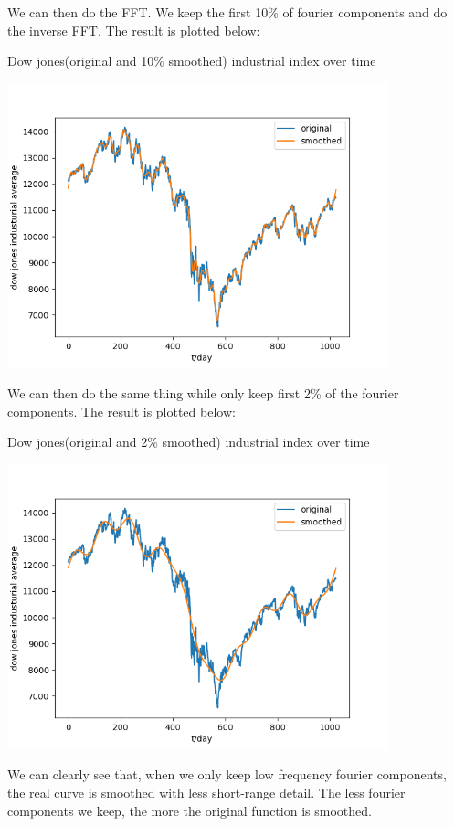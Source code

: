 \documentclass[letterpaper,12pt]{article}
\begin{document}
We can then do the FFT. We keep the first 10\% of fourier components and do the inverse FFT. The result is plotted below:

\begin{table}[!h]
    \centering
    \caption{Dow jones(original and 10\% smoothed) industrial index over time}
    \includegraphics[width=11cm]{8-3-2.png}
\end{table}%
\newpage

We can then do the same thing while only keep first 2\% of the fourier components. The result is plotted below:

\begin{table}[!h]
    \centering
    \caption{Dow jones(original and 2\% smoothed) industrial index over time}
    \includegraphics[width=11cm]{8-3-3.png}
\end{table}%
\newpage

We can clearly see that, when we only keep low frequency fourier components, the real curve is smoothed with less short-range detail. The less fourier components we keep, the more the original function is smoothed.
\end{document}
